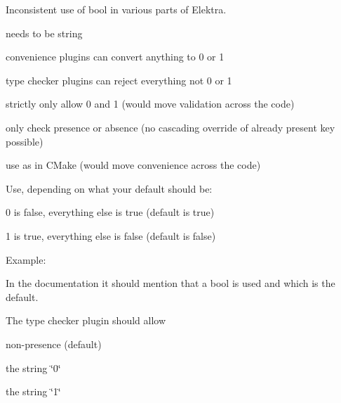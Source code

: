 Inconsistent use of bool in various parts of Elektra.


\begin{DoxyItemize}
\item needs to be string
\item convenience plugins can convert anything to 0 or 1
\item type checker plugins can reject everything not 0 or 1
\end{DoxyItemize}


\begin{DoxyItemize}
\item strictly only allow 0 and 1 (would move validation across the code)
\item only check presence or absence (no cascading override of already present key possible)
\item use as in C\+Make (would move convenience across the code)
\end{DoxyItemize}

Use, depending on what your default should be\+:


\begin{DoxyItemize}
\item 0 is false, everything else is true (default is true)
\item 1 is true, everything else is false (default is false)
\end{DoxyItemize}

Example\+:


\begin{DoxyCode}{0}
\end{DoxyCode}


In the documentation it should mention that a bool is used and which is the default.

The type checker plugin should allow


\begin{DoxyItemize}
\item non-\/presence (default)
\item the string \char`\"{}0\char`\"{}
\item the string \char`\"{}1\char`\"{}
\end{DoxyItemize}

